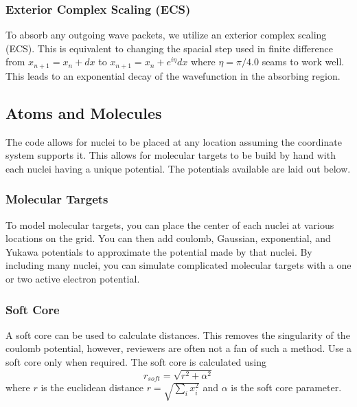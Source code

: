 \documentclass{article}
\begin{document}
\subsubsection{Exterior Complex Scaling (ECS)} %
\label{ssub:exterer_complex_scaling}
To absorb any outgoing wave packets, we utilize an exterior complex scaling (ECS). This is equivalent to changing the spacial step used in finite difference from $x_{n+1} = x_n+dx$ to $x_{n+1} = x_n+e^{i\eta}dx$ where $\eta=\pi / 4.0$ seams to work well. This leads to an exponential decay of the wavefunction in the absorbing region.


\subsection{Atoms and Molecules} %
\label{sub:atoms_and_molecules}
The code allows for nuclei to be placed at any location assuming the coordinate system supports it. This allows for molecular targets to be build by hand with each nuclei having a unique potential. The potentials available are laid out below.

\subsubsection{Molecular Targets} %
\label{ssub:molecular_targets}
To model molecular targets, you can place the center of each nuclei at various locations on the grid. You can then add coulomb, Gaussian, exponential, and Yukawa potentials to approximate the potential made by that nuclei. By including many nuclei, you can simulate complicated molecular targets with a one or two active electron potential.

\subsubsection{Soft Core} %
\label{ssub:soft_core_like}
A soft core can be used to calculate distances. This removes the singularity of the coulomb potential, however, reviewers are often not a fan of such a method. Use a soft core only when required. The soft core is calculated using
\begin{equation}
  r_{soft} = \sqrt{r^2 + \alpha^2}
  \label{eq:soft_core}
\end{equation}
where $r$ is the euclidean distance $r=\sqrt{\sum\limits_i x_i^2}$ and $\alpha$ is the soft core parameter.
\end{document}

